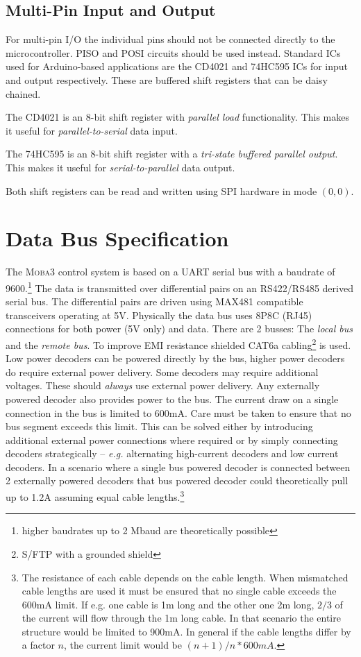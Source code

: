 \documentclass{scrreprt}
\newcommand\eg{\emph{e.g. }}
\begin{document}
\subsection{Multi-Pin Input and Output}
For multi-pin I/O the individual pins should not be connected directly to the microcontroller.
PISO and POSI circuits should be used instead.
Standard ICs used for Arduino-based applications are the CD4021 and 74HC595 ICs for input and output respectively.
These are buffered shift registers that can be daisy chained.

The CD4021 is an 8-bit shift register with \emph{parallel load} functionality.
This makes it useful for \emph{parallel-to-serial} data input.

The 74HC595 is an 8-bit shift register with a \emph{tri-state buffered parallel output}.
This makes it useful for \emph{serial-to-parallel} data output.

Both shift registers can be read and written using SPI hardware in mode $(0,0)$.

\section{Data Bus Specification}
The \textsc{Moba3} control system is based on a UART serial bus with a baudrate of 9600.\footnote{higher baudrates up to 2 Mbaud are theoretically possible}
The data is transmitted over differential pairs on an RS422/RS485 derived serial bus.
The differential pairs are driven using MAX481 compatible transceivers operating at 5V.
Physically the data bus uses 8P8C (RJ45) connections for both power (5V only) and data.
There are 2 busses:
The \emph{local bus} and the \emph{remote bus}.
To improve EMI resistance shielded CAT6a cabling\footnote{S/FTP with a grounded shield} is used.
Low power decoders can be powered directly by the bus, higher power decoders do require external power delivery.
Some decoders may require additional voltages.
These should \emph{always} use external power delivery.
Any externally powered decoder also provides power to the bus.
The current draw on a single connection in the bus is limited to 600mA.
Care must be taken to ensure that no bus segment exceeds this limit.
This can be solved either by introducing additional external power connections where required or by simply connecting decoders strategically -- \eg alternating high-current decoders and low current decoders.
In a scenario where a single bus powered decoder is connected between 2 externally powered decoders that bus powered decoder could theoretically pull up to 1.2A assuming equal cable lengths.\footnote{The resistance of each cable depends on the cable length.
When mismatched cable lengths are used it must be ensured that no single cable exceeds the 600mA limit.
If e.g. one cable is 1m long and the other one 2m long, $2/3$ of the current will flow through the 1m long cable.
In that scenario the entire structure would be limited to 900mA.
In general if the cable lengths differ by a factor $n$, the current limit would be $(n+1)/n * 600mA$.}
\end{document}
